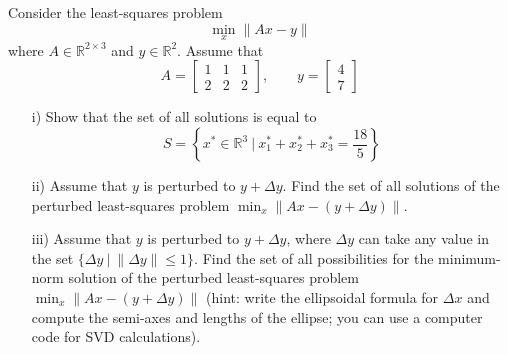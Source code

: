 \begin{homeworkProblem}

    Consider the least-squares problem
    \begin{equation}
        \min_x \|Ax-y\|
    \end{equation}
    where $A\in\mathbb R^{2\times 3}$ and $y\in\mathbb R^2$. Assume that 
    \begin{equation}
        A=\left[\begin{array}{ccc} 1 & 1 &1 \\ 2& 2 & 2 \end{array}\right],
        \qquad 
        y=\left[\begin{array}{cc} 4 \\ 7 \end{array}\right]
    \end{equation}
    \begin{itemize}
        \item [i)]
        Show that the set of all solutions is equal to
        \begin{equation}
            S=\left\{x^*\in\mathbb R^3 \ \Big| \ x_1^*+x_2^*+x_3^*=\frac{18}{5}
            \right\}
        \end{equation}
        \item [ii)] Assume that $y$ is perturbed to $y+\Delta y$. Find the set 
        of all solutions of the perturbed least-squares problem 
        $\min_x \|Ax-(y+\Delta y)\|$. 

        \item [iii)] Assume that $y$ is perturbed to $y+\Delta y$, where 
        $\Delta y$ can take any value in the set $\{\Delta y \ |\ 
        \|\Delta y\|\leq 1\}$. Find the set of all possibilities for the 
        minimum-norm solution of the perturbed least-squares problem 
        $\min_x \|Ax-(y+\Delta y)\|$ (hint: write the ellipsoidal formula for 
        $\Delta x$ and compute the semi-axes and lengths of the ellipse; you 
        can use a computer code for SVD calculations).
         
    \end{itemize}

    \begin{solution}
    \end{solution}

\end{homeworkProblem}
